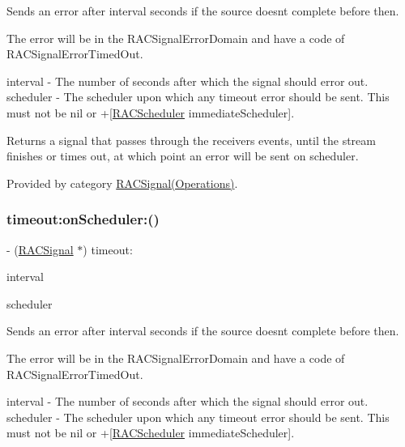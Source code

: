 Sends an error after {\ttfamily interval} seconds if the source doesn\textquotesingle{}t complete before then.

The error will be in the R\+A\+C\+Signal\+Error\+Domain and have a code of R\+A\+C\+Signal\+Error\+Timed\+Out.

interval -\/ The number of seconds after which the signal should error out. scheduler -\/ The scheduler upon which any timeout error should be sent. This must not be nil or +\mbox{[}\mbox{\hyperlink{interface_r_a_c_scheduler}{R\+A\+C\+Scheduler}} immediate\+Scheduler\mbox{]}.

Returns a signal that passes through the receiver\textquotesingle{}s events, until the stream finishes or times out, at which point an error will be sent on {\ttfamily scheduler}. 

Provided by category \mbox{\hyperlink{category_r_a_c_signal_07_operations_08_a8c5f03f4cc8a132e91a985f3d5ccebc0}{R\+A\+C\+Signal(\+Operations)}}.

\mbox{\label{interface_r_a_c_signal_a8c5f03f4cc8a132e91a985f3d5ccebc0}} 
\subsubsection{\texorpdfstring{timeout\+:on\+Scheduler\+:()}{timeout:onScheduler:()}\hspace{0.1cm}{\footnotesize\ttfamily [2/3]}}
{\footnotesize\ttfamily -\/ (\mbox{\hyperlink{interface_r_a_c_signal}{R\+A\+C\+Signal}} $\ast$) timeout\+: \begin{DoxyParamCaption}\item[{(N\+S\+Time\+Interval)}]{interval }\item[{onScheduler:(\mbox{\hyperlink{interface_r_a_c_scheduler}{R\+A\+C\+Scheduler}} $\ast$)}]{scheduler }\end{DoxyParamCaption}}

Sends an error after {\ttfamily interval} seconds if the source doesn\textquotesingle{}t complete before then.

The error will be in the R\+A\+C\+Signal\+Error\+Domain and have a code of R\+A\+C\+Signal\+Error\+Timed\+Out.

interval -\/ The number of seconds after which the signal should error out. scheduler -\/ The scheduler upon which any timeout error should be sent. This must not be nil or +\mbox{[}\mbox{\hyperlink{interface_r_a_c_scheduler}{R\+A\+C\+Scheduler}} immediate\+Scheduler\mbox{]}.

